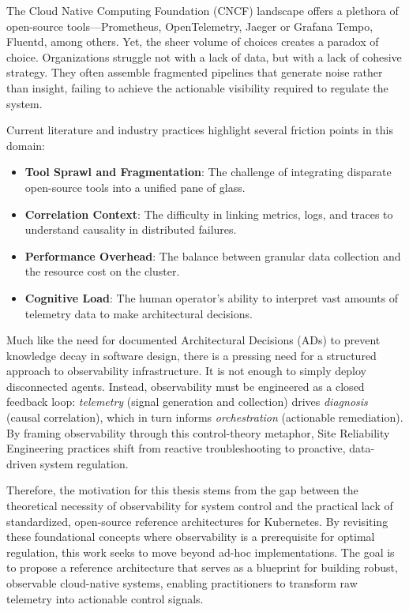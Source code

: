 The Cloud Native Computing Foundation (CNCF) landscape offers a plethora of open-source tools—Prometheus, OpenTelemetry, Jaeger or Grafana Tempo, Fluentd, among others. Yet, the sheer volume of choices creates a paradox of choice. Organizations struggle not with a lack of data, but with a lack of cohesive strategy. They often assemble fragmented pipelines that generate noise rather than insight, failing to achieve the actionable visibility required to regulate the system.

Current literature and industry practices highlight several friction points in this domain:

\begin{itemize}
    \item \textbf{Tool Sprawl and Fragmentation}: The challenge of integrating disparate open-source tools into a unified pane of glass.
    \item \textbf{Correlation Context}: The difficulty in linking metrics, logs, and traces to understand causality in distributed failures.
    \item \textbf{Performance Overhead}: The balance between granular data collection and the resource cost on the cluster.
    \item \textbf{Cognitive Load}: The human operator's ability to interpret vast amounts of telemetry data to make architectural decisions.
\end{itemize}

Much like the need for documented Architectural Decisions (ADs) to prevent knowledge decay in software design, there is a pressing need for a structured approach to observability infrastructure. It is not enough to simply deploy disconnected agents. Instead, observability must be engineered as a closed feedback loop: \textit{telemetry} (signal generation and collection) drives \textit{diagnosis} (causal correlation), which in turn informs \textit{orchestration} (actionable remediation). By framing observability through this control-theory metaphor, Site Reliability Engineering practices shift from reactive troubleshooting to proactive, data-driven system regulation.

Therefore, the motivation for this thesis stems from the gap between the theoretical necessity of observability for system control and the practical lack of standardized, open-source reference architectures for Kubernetes. By revisiting these foundational concepts where observability is a prerequisite for optimal regulation, this work seeks to move beyond ad-hoc implementations. The goal is to propose a reference architecture that serves as a blueprint for building robust, observable cloud-native systems, enabling practitioners to transform raw telemetry into actionable control signals.